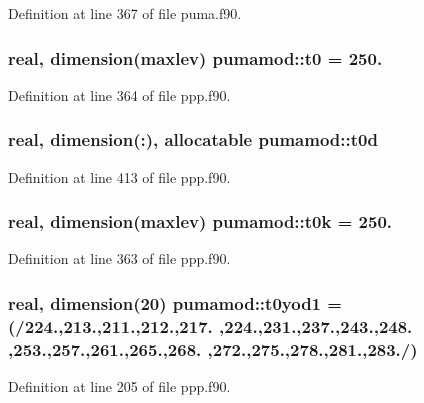 \-Definition at line 367 of file puma.\-f90.

\hypertarget{classpumamod_aaa502cf0bf055e6a77058cb9a894c808}{
\subsubsection[{t0}]{\setlength{\rightskip}{0pt plus 5cm}real, dimension(maxlev) {\bf pumamod\-::t0} = 250.}}
\label{classpumamod_aaa502cf0bf055e6a77058cb9a894c808}


\-Definition at line 364 of file ppp.\-f90.

\hypertarget{classpumamod_a2ce41df1b8a64f3eb8788faa374977e7}{
\subsubsection[{t0d}]{\setlength{\rightskip}{0pt plus 5cm}real, dimension(\-:), allocatable {\bf pumamod\-::t0d}}}
\label{classpumamod_a2ce41df1b8a64f3eb8788faa374977e7}


\-Definition at line 413 of file ppp.\-f90.

\hypertarget{classpumamod_a15be485545b52c4c0fa534fe17e9408b}{
\subsubsection[{t0k}]{\setlength{\rightskip}{0pt plus 5cm}real, dimension(maxlev) {\bf pumamod\-::t0k} = 250.}}
\label{classpumamod_a15be485545b52c4c0fa534fe17e9408b}


\-Definition at line 363 of file ppp.\-f90.

\hypertarget{classpumamod_a90a6d9081ae4e97368fd93f921dca1d8}{
\subsubsection[{t0yod1}]{\setlength{\rightskip}{0pt plus 5cm}real, dimension(20) {\bf pumamod\-::t0yod1} = (/224.,213.,211.,212.,217. ,224.,231.,237.,243.,248. ,253.,257.,261.,265.,268. ,272.,275.,278.,281.,283./)}}
\label{classpumamod_a90a6d9081ae4e97368fd93f921dca1d8}


\-Definition at line 205 of file ppp.\-f90.

